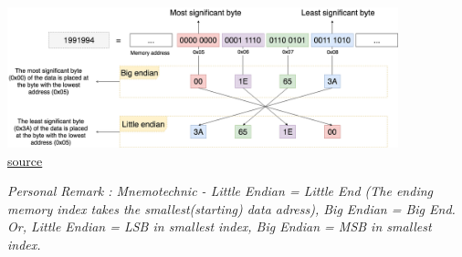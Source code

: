 \begin{center}
    \includegraphics[width=0.85\textwidth]{chapters/chapter1c/images/final_endian.png} \\
    \href{https://www.google.com/url?sa=i&url=https%3A%2F%2Fmedium.com%2Fmycsdegree%2Fsockets-in-c-little-and-big-endian-machines-23c9ed484c20&psig=AOvVaw1P8zdPW_G0ioJC2Ka6cOX5&ust=1731236021875000&source=images&cd=vfe&opi=89978449&ved=0CBQQjRxqFwoTCPinlvaKz4kDFQAAAAAdAAAAABAJ}{source}
\end{center}
\textit{Personal Remark : Mnemotechnic - Little Endian = Little End (The ending memory index takes the smallest(starting) data adress), Big Endian = Big End.}
\textit{Or, Little Endian = LSB in smallest index, Big Endian = MSB in smallest index.}